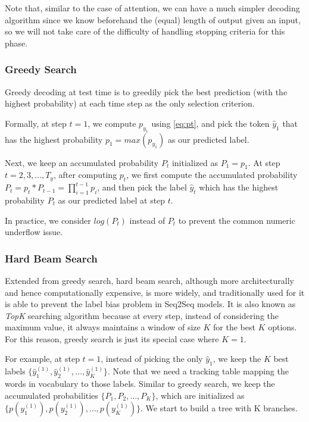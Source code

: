\documentclass[11pt,a4paper]{article}
\begin{document}
Note that, similar to the case of attention, we can have a much simpler decoding algorithm since we know beforehand the (equal) length of output given an input, so we will not take care of the difficulty of handling stopping criteria for this phase.  

\subsubsection{Greedy Search}
Greedy decoding at test time is to greedily pick the best prediction (with the highest probability) at each time step as the only selection criterion. 

Formally, at step $t=1$, we compute $p_{y_1}$ using \eqref{eq:pt}, and pick the token $\hat{y}_1$ that has the highest probability $p_1 = max(p_{y_1})$ as our predicted label. 

Next, we keep an accumulated probability $P_t$ initialized as $P_1 = p_1$. At step $t = 2, 3, \dots, T_y$, after computing $p_t$, we first compute the accumulated probability $P_t = p_t * P_{t-1} = \prod_{i=1}^{t-1} p_i$, and then pick the label $\hat{y}_t$ which has the highest probability $P_t$ as our predicted label at step $t$. 

In practice, we consider $log(P_t)$ instead of $P_t$ to prevent the common numeric underflow issue. 

\subsubsection{Hard Beam Search}
Extended from greedy search, hard beam search, although more architecturally and hence computationally expensive, is more widely, and traditionally used \cite{seq2seq_2014} for it is able to prevent the label bias problem in Seq2Seq models. It is also known as \textit{TopK} searching algorithm because at every step, instead of considering the maximum value, it always maintains a window of size $K$ for the best $K$ options. For this reason, greedy search is just its special case where $K=1$. 

For example, at step $t=1$, instead of picking the only $\hat{y}_1$, we keep the $K$ best labels $\{ \hat{y}^{(1)}_{1}, \hat{y}^{(1)}_{2}, \dots, \hat{y}^{(1)}_{K} \}$. Note that we need a tracking table mapping the words in vocabulary to those labels. Similar to greedy search, we keep the accumulated probabilities $\{ P_1, P_2, ..., P_K \}$, which are initialized as 
$\{ p(y^{(1)}_{1}), p(y^{(1)}_{2}), \dots, p(y^{(1)}_{K}) \}$. We start to build a tree with K branches. 
\end{document}
